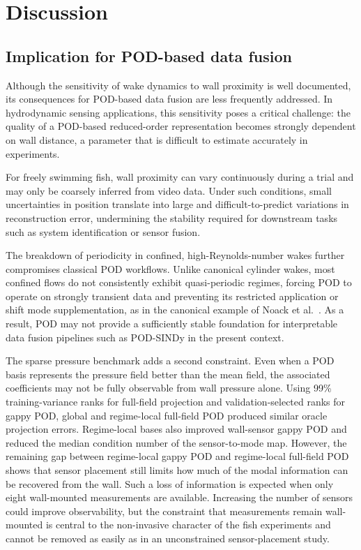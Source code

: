 \documentclass[preprint,12pt]{elsarticle}
\begin{document}
\section{Discussion}
\label{sec5}
\subsection{Implication for POD-based data fusion}
\label{subsec5.1}
Although the sensitivity of wake dynamics to wall proximity is well documented, its consequences for POD-based data fusion are less frequently addressed. In hydrodynamic sensing applications, this sensitivity poses a critical challenge: the quality of a POD-based reduced-order representation becomes strongly dependent on wall distance, a parameter that is difficult to estimate accurately in experiments.

For freely swimming fish, wall proximity can vary continuously during a trial and may only be coarsely inferred from video data. Under such conditions, small uncertainties in position translate into large and difficult-to-predict variations in reconstruction error, undermining the stability required for downstream tasks such as system identification or sensor fusion.

The breakdown of periodicity in confined, high-Reynolds-number wakes further compromises classical POD workflows. Unlike canonical cylinder wakes, most confined flows do not consistently exhibit quasi-periodic regimes, forcing POD to operate on strongly transient data and preventing its restricted application or shift mode supplementation, as in the canonical example of Noack et al.~\citep{Noack2003}. As a result, POD may not provide a sufficiently stable foundation for interpretable data fusion pipelines such as POD-SINDy in the present context.

The sparse pressure benchmark adds a second constraint. Even when a POD basis represents the pressure field better than the mean field, the associated coefficients may not be fully observable from wall pressure alone. Using 99\% training-variance ranks for full-field projection and validation-selected ranks for gappy POD, global and regime-local full-field POD produced similar oracle projection errors. Regime-local bases also improved wall-sensor gappy POD and reduced the median condition number of the sensor-to-mode map. However, the remaining gap between regime-local gappy POD and regime-local full-field POD shows that sensor placement still limits how much of the modal information can be recovered from the wall. Such a loss of information is expected when only eight wall-mounted measurements are available. Increasing the number of sensors could improve observability, but the constraint that measurements remain wall-mounted is central to the non-invasive character of the fish experiments and cannot be removed as easily as in an unconstrained sensor-placement study.
\end{document}

